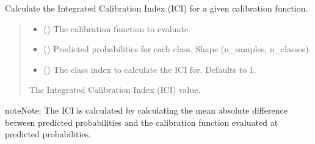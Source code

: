 \documentclass[letterpaper,10pt,english]{sphinxmanual}
\begin{document}
\begin{fulllineitems}
\label{\detokenize{calzone:calzone.metrics.cal_ICI_func}}
\pysigstartsignatures
{}
\pysigstopsignatures
\sphinxAtStartPar
Calculate the Integrated Calibration Index (ICI) for a given calibration function.
\begin{quote}\begin{description}
\begin{itemize}
\item {} 
\sphinxAtStartPar
{} () \textendash{} The calibration function to evaluate.

\item {} 
\sphinxAtStartPar
{} () \textendash{} Predicted probabilities for each class. Shape (n\_samples, n\_classes).

\item {} 
\sphinxAtStartPar
{} (\sphinxstyleliteralemphasis{\sphinxupquote{, }}) \textendash{} The class index to calculate the ICI for. Defaults to 1.

\end{itemize}

\sphinxAtStartPar
{} \textendash{} The Integrated Calibration Index (ICI) value.

\end{description}\end{quote}

\begin{sphinxadmonition}{note}{Note:}
\sphinxAtStartPar
The ICI is calculated by calculating the mean absolute difference between
predicted probabilities and the calibration function evaluated at predicted probabilities.
\end{sphinxadmonition}

\end{fulllineitems}
\end{document}
